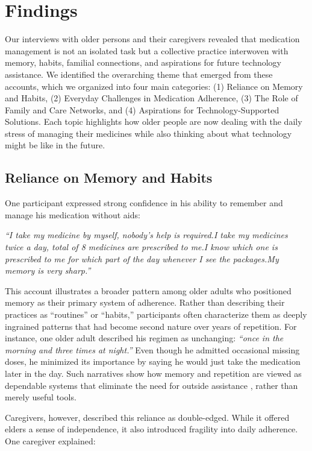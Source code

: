 \documentclass[acmlarge]{acmart}
\begin{document}
\section{Findings}
Our interviews with older persons and their caregivers revealed that
medication management is not an isolated task but a collective practice
interwoven with memory, habits, familial connections, and aspirations
for future technology assistance. We identified the overarching theme
that emerged from these accounts, which we organized into four main
categories: (1) Reliance on Memory and Habits, (2) Everyday Challenges
in Medication Adherence, (3) The Role of Family and Care Networks, and
(4) Aspirations for Technology-Supported Solutions. Each topic
highlights how older people are now dealing with the daily stress of
managing their medicines while also thinking about what technology might
be like in the future.

\subsection{Reliance on Memory and Habits}
One participant expressed strong confidence in his ability to remember
and manage his medication without aids:

\emph{``I take my medicine by myself, nobody's help is required.I take
my medicines twice a day, total of 8 medicines are prescribed to me.I
know which one is prescribed to me for which part of the day whenever I
see the packages.My memory is very sharp.''}

This account illustrates a broader pattern among older adults who
positioned memory as their primary system of adherence. Rather than
describing their practices as ``routines'' or ``habits,'' participants
often characterize them as deeply ingrained patterns that had become
second nature over years of repetition. For instance, one older adult
described his regimen as unchanging: \emph{``once in the morning and
three times at night.''} Even though he admitted occasional missing
doses, he minimized its importance by saying he would just take the
medication later in the day. Such narratives show how memory and
repetition are viewed as dependable systems that eliminate the need for
outside assistance , rather than merely useful tools.

Caregivers, however, described this reliance as double-edged. While it
offered elders a sense of independence, it also introduced fragility
into daily adherence. One caregiver explained:
\end{document}

